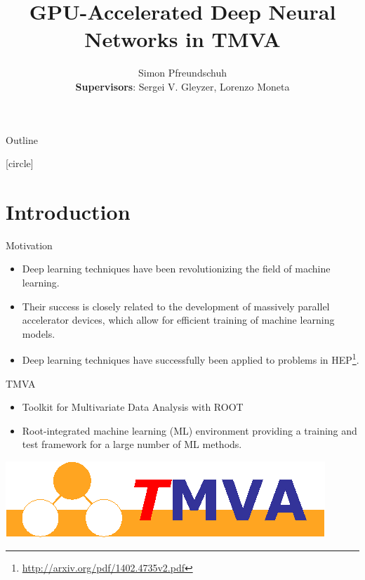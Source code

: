 \documentclass{beamer}
\title[Your Short Title]{GPU-Accelerated Deep Neural Networks in TMVA}
\date{}
\author{Simon Pfreundschuh  \\ \textbf{Supervisors}: Sergei V. Gleyzer, Lorenzo Moneta}
\begin{document}
\begin{frame}
  \titlepage
\end{frame}

\begin{frame}{Outline}
 \tableofcontents
\end{frame}
[circle]
\section{Introduction}

\begin{frame}{Motivation}
  \begin{itemize}
    \item Deep learning techniques have been revolutionizing
      the field of machine learning.
    \item Their success is closely related to the development of
      massively parallel accelerator devices, which allow for efficient
      training of machine learning models.
    \item Deep learning techniques have successfully been applied to
      problems in HEP\footnote{\url{http://arxiv.org/pdf/1402.4735v2.pdf}}.
  \end{itemize}
\end{frame}

\begin{frame}{TMVA}
  \begin{itemize}
    \item Toolkit for Multivariate Data Analysis with ROOT
    \item Root-integrated machine learning (ML) environment providing
      a training and test framework for a large number of ML methods.
  \end{itemize}
  \vfill
  \centering
  \includegraphics[width=0.5\linewidth]{tmva}
\end{frame}
\end{document}
